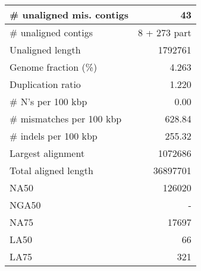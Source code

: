 \documentclass[12pt,a4paper]{article}
\begin{document}
\begin{table}[ht]
\begin{center}
\begin{tabular}{|l*{1}{|r}|}
\# unaligned mis. contigs & 43 \\ \hline
\# unaligned contigs & 8 + 273 part \\ \hline
Unaligned length & 1792761 \\ \hline
Genome fraction (\%) & 4.263 \\ \hline
Duplication ratio & 1.220 \\ \hline
\# N's per 100 kbp & 0.00 \\ \hline
\# mismatches per 100 kbp & 628.84 \\ \hline
\# indels per 100 kbp & 255.32 \\ \hline
Largest alignment & 1072686 \\ \hline
Total aligned length & 36897701 \\ \hline
NA50 & 126020 \\ \hline
NGA50 & - \\ \hline
NA75 & 17697 \\ \hline
LA50 & 66 \\ \hline
LA75 & 321 \\ \hline
\end{tabular}
\end{center}
\end{table}
\end{document}
